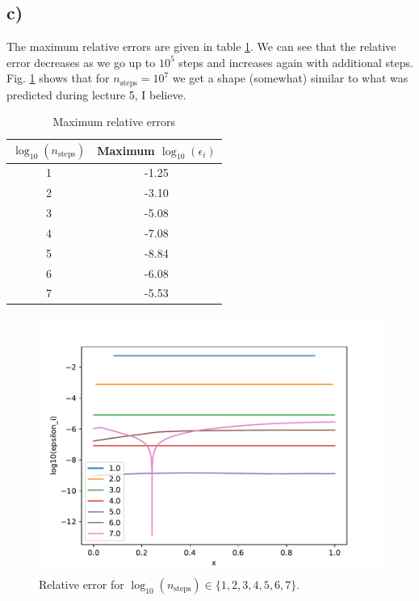 \documentclass[english,notitlepage]{revtex4-2}  %
\begin{document}
\subsection*{c)}
The maximum relative errors are given in table \ref{tab:1}. We can see that the relative error decreases as we go up to $10^5$ steps and increases again with additional steps. Fig. \ref{fig:5} shows that for $n_{\text{steps}}=10^7$ we get a shape (somewhat) similar to what was predicted during lecture 5, I believe. 
\begin{table}
	\centering
	\caption{Maximum relative errors}
	\begin{tabular}{c@{\hspace{1cm}} c}
		\hline
		$\log_{10}(n_{\text{steps}})$ & Maximum $\log_{10}(\epsilon_i)$ \\
		\hline
		1 & -1.25 \\
		2 &  -3.10 \\
		3 &  -5.08 \\
		4 &  -7.08 \\
		5 &  -8.84 \\
		6 &  -6.08 \\
		7 &  -5.53 \\
		\hline
	\end{tabular}\label{tab:1}
\end{table}

\begin{figure}
	\includegraphics[scale=0.9]{imgs/problem8c_output.pdf}
	\caption{Relative error for $\log_{10}(n_{\text{steps}})\in\{1,2,3,4,5,6,7\}$.}
	\label{fig:5}
\end{figure}
\end{document}
